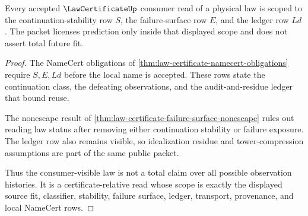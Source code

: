 \begin{theorem}
\label{thm:law-certificate-continuation-scope}
Every accepted $\LawCertificateUp$ consumer read of a physical law is scoped to the continuation-stability row $S$, the failure-surface row $E$, and the ledger row $Ld$. The packet licenses prediction only inside that displayed scope and does not assert total future fit.
\end{theorem}
\begin{proof}
The NameCert obligations of \autoref{thm:law-certificate-namecert-obligations} require $S,E,Ld$ before the local name is accepted. These rows state the continuation class, the defeating observations, and the audit-and-residue ledger that bound reuse.

The nonescape result of \autoref{thm:law-certificate-failure-surface-nonescape} rules out reading law status after removing either continuation stability or failure exposure. The ledger row also remains visible, so idealization residue and tower-compression assumptions are part of the same public packet.

Thus the consumer-visible law is not a total claim over all possible observation histories. It is a certificate-relative read whose scope is exactly the displayed source fit, classifier, stability, failure surface, ledger, transport, provenance, and local NameCert rows.
\end{proof}

